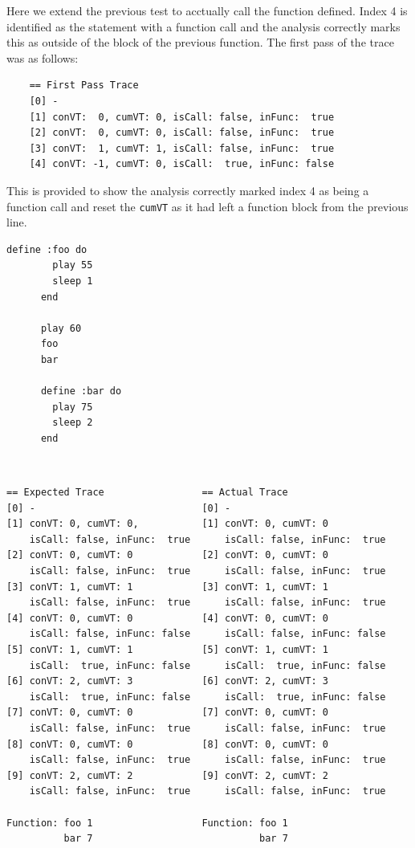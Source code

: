 \documentclass[11pt, abstracton, twoside, titlepage=true]{scrartcl}
\begin{document}
Here we extend the previous test to acctually call the function defined. Index 
4 is identified as the statement with a function call and the analysis correctly 
marks this as outside of the block of the previous function. The first pass of 
the trace was as follows:
\\
\begin{lstlisting}
    == First Pass Trace
    [0] -
    [1] conVT:  0, cumVT: 0, isCall: false, inFunc:  true
    [2] conVT:  0, cumVT: 0, isCall: false, inFunc:  true
    [3] conVT:  1, cumVT: 1, isCall: false, inFunc:  true
    [4] conVT: -1, cumVT: 0, isCall:  true, inFunc: false
\end{lstlisting}

This is provided to show the analysis correctly marked index 4 as being a function 
call and reset the \texttt{cumVT} as it had left a function block from the previous 
line.

\begin{minipage}{\textwidth}
	\begin{lstlisting}[style = sonicpi]
      define :foo do      
        play 55
        sleep 1
      end

      play 60
      foo
      bar

      define :bar do
        play 75
        sleep 2
      end
	\end{lstlisting}
\end{minipage}
\\
\begin{lstlisting}
== Expected Trace                 == Actual Trace
[0] -                             [0] -
[1] conVT: 0, cumVT: 0,           [1] conVT: 0, cumVT: 0
    isCall: false, inFunc:  true      isCall: false, inFunc:  true            
[2] conVT: 0, cumVT: 0            [2] conVT: 0, cumVT: 0
    isCall: false, inFunc:  true      isCall: false, inFunc:  true 
[3] conVT: 1, cumVT: 1            [3] conVT: 1, cumVT: 1
    isCall: false, inFunc:  true      isCall: false, inFunc:  true 
[4] conVT: 0, cumVT: 0            [4] conVT: 0, cumVT: 0
    isCall: false, inFunc: false      isCall: false, inFunc: false 
[5] conVT: 1, cumVT: 1            [5] conVT: 1, cumVT: 1
    isCall:  true, inFunc: false      isCall:  true, inFunc: false 
[6] conVT: 2, cumVT: 3            [6] conVT: 2, cumVT: 3
    isCall:  true, inFunc: false      isCall:  true, inFunc: false 
[7] conVT: 0, cumVT: 0            [7] conVT: 0, cumVT: 0
    isCall: false, inFunc:  true      isCall: false, inFunc:  true 
[8] conVT: 0, cumVT: 0            [8] conVT: 0, cumVT: 0
    isCall: false, inFunc:  true      isCall: false, inFunc:  true 
[9] conVT: 2, cumVT: 2            [9] conVT: 2, cumVT: 2
    isCall: false, inFunc:  true      isCall: false, inFunc:  true 

Function: foo 1                   Function: foo 1
          bar 7                             bar 7
\end{lstlisting}
\end{document}
